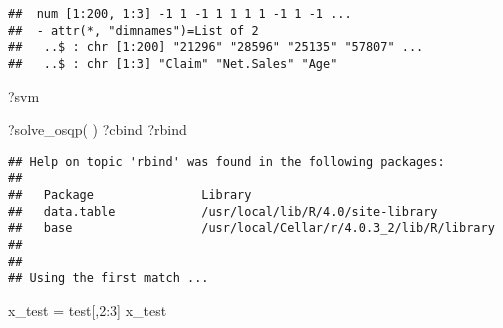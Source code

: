 \documentclass[
]{article}
\newenvironment{Shaded}{\begin{snugshade}}{\end{snugshade}}
\newcommand{\DecValTok}[1]{\textcolor[rgb]{0.00,0.00,0.81}{#1}}
\newcommand{\FunctionTok}[1]{\textcolor[rgb]{0.00,0.00,0.00}{#1}}
\newcommand{\NormalTok}[1]{#1}
\newcommand{\OtherTok}[1]{\textcolor[rgb]{0.56,0.35,0.01}{#1}}
\newcommand{\SpecialCharTok}[1]{\textcolor[rgb]{0.00,0.00,0.00}{#1}}
\begin{document}
\begin{verbatim}
##  num [1:200, 1:3] -1 1 -1 1 1 1 1 -1 1 -1 ...
##  - attr(*, "dimnames")=List of 2
##   ..$ : chr [1:200] "21296" "28596" "25135" "57807" ...
##   ..$ : chr [1:3] "Claim" "Net.Sales" "Age"
\end{verbatim}

\begin{Shaded}
\begin{Highlighting}[]
\NormalTok{?svm}

\NormalTok{?}\FunctionTok{solve\_osqp}\NormalTok{( )}
\NormalTok{?cbind}
\NormalTok{?rbind}
\end{Highlighting}
\end{Shaded}

\begin{verbatim}
## Help on topic 'rbind' was found in the following packages:
## 
##   Package               Library
##   data.table            /usr/local/lib/R/4.0/site-library
##   base                  /usr/local/Cellar/r/4.0.3_2/lib/R/library
## 
## 
## Using the first match ...
\end{verbatim}

\begin{Shaded}
\begin{Highlighting}[]
\NormalTok{x\_test }\OtherTok{=}\NormalTok{ test[,}\DecValTok{2}\SpecialCharTok{:}\DecValTok{3}\NormalTok{]}
\NormalTok{x\_test}
\end{Highlighting}
\end{Shaded}
\end{document}
